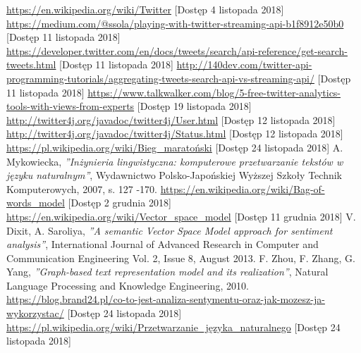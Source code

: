 \printbibliography
\clearpage
\begin{thebibliography}{99}
		\bibitem{[1]} 
		\url{https://en.wikipedia.org/wiki/Twitter} [Dostęp 4 listopada 2018]
		\bibitem{[2]}
		\url{https://medium.com/@ssola/playing-with-twitter-streaming-api-b1f8912e50b0} [Dostęp 11 listopada 2018]
		\bibitem{[3]}
		\url{https://developer.twitter.com/en/docs/tweets/search/api-reference/get-search-tweets.html} [Dostęp 11 listopada 2018]
		\bibitem{[4]}
		\url{http://140dev.com/twitter-api-programming-tutorials/aggregating-tweets-search-api-vs-streaming-api/} [Dostęp 11 listopada 2018]
		\bibitem{[5]}
		\url{https://www.talkwalker.com/blog/5-free-twitter-analytics-tools-with-views-from-experts} [Dostęp 19 listopada 2018]
		\bibitem{[6]}
		\url{http://twitter4j.org/javadoc/twitter4j/User.html} [Dostęp 12 listopada 2018]
		\bibitem{[7]}
		\url{http://twitter4j.org/javadoc/twitter4j/Status.html} [Dostęp 12 listopada 2018]
		\bibitem{[8]}
		\url{https://pl.wikipedia.org/wiki/Bieg_maratoński} [Dostęp 24 listopada 2018]
		\bibitem{[9]}
		A. Mykowiecka, \textit{''Inżynieria lingwistyczna: komputerowe przetwarzanie tekstów w języku naturalnym''}, Wydawnictwo Polsko-Japońskiej Wyższej Szkoły Technik Komputerowych, 2007, s. 127 -170.
		\bibitem{[10]}
		\url{https://en.wikipedia.org/wiki/Bag-of-words_model} [Dostęp 2 grudnia 2018]
		\bibitem{[11]}
		\url{https://en.wikipedia.org/wiki/Vector_space_model} [Dostęp 11 grudnia 2018]
		\bibitem{[12]}
		V. Dixit, A. Saroliya, \textit{''A semantic Vector Space Model approach for sentiment analysis''}, International Journal of Advanced Research in Computer and Communication Engineering
		Vol. 2, Issue 8, August 2013.
		\bibitem{[13]}
		F. Zhou, F. Zhang, G. Yang, \textit{''Graph-based text representation model and its realization''}, Natural Language Processing and Knowledge Engineering, 2010.
		\bibitem{[14]}
		\url{https://blog.brand24.pl/co-to-jest-analiza-sentymentu-oraz-jak-mozesz-ja-wykorzystac/} [Dostęp 24 listopada 2018]
		\bibitem{[15]}
		\url{https://pl.wikipedia.org/wiki/Przetwarzanie_języka_naturalnego} [Dostęp 24 listopada 2018]

\end{thebibliography}
